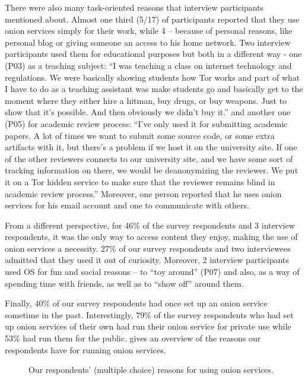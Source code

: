 There were also many task-oriented reasons that interview participants mentioned about. Almost one third (5/17) of participants reported that they use onion services simply for their work, while 4 – because of personal reasons, like personal blog or giving someone an access to his home network. Two interview participants used them for educational purposes but both in a different way - one (P03) as a teaching subject: “I was teaching a class on internet technology and regulations. We were basically showing students how Tor works and part of what I have to do as a teaching assistant was make students go and basically get to the moment where they either hire a hitman, buy drugs, or buy weapons. Just to show that it's possible. And then obviously we didn't buy it.” and another one (P05) for academic review process: “I've only used it for submitting academic papers. A lot of times we want to submit some source code, or some extra artifacts with it, but there's a problem if we host it on the university site. If one of the other reviewers connects to our university site, and we have some sort of tracking information on there, we would be deanonymizing the reviewer. We put it on a Tor hidden service to make sure that the reviewer remains blind in academic review process.” Moreover, one person reported that he uses onion services for his email account and one to communicate with others.

From a different perspective, for 46\% of the survey respondents and 3 interview respondents, it was the only way to access content they enjoy, making the use of
onion services a necessity. 27\% of our survey respondents and two interviewees admitted that they used it out of
curiosity. Moreover, 2 interview participants used OS for fun and social reasons – to “toy around” (P07) and also, as a way of spending time with friends, as well as to “show off” around them. 
 
Finally, 40\% of our survey respondents had once set up an onion service sometime in the past. 
Interestingly, 79\% of the survey respondents who had set up onion services of their own had run their onion service for
private use while 53\% had run them for the public.  gives an overview of the reasons our
respondents have for running onion services. 


\begin{figure}[t]
    \centering
    
    \caption{Our respondents' (multiple choice) reasons for using onion
    services.}
    \label{fig:onion-usage}
\end{figure}



